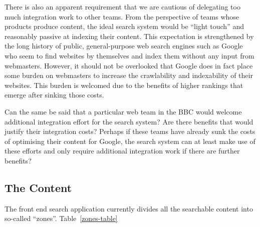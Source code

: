 There is also an apparent requirement that we are cautious of delegating
too much integration work to other teams. From the perspective of teams
whose products produce content, the ideal search system would be
``light touch'' and reasonably passive at indexing their content. This
expectation is strengthened by the long history of public, general-purpose
web search engines such as Google who seem to find websites by themselves
and index them without any input from webmasters. However, it should
not be overlooked that Google does in fact place some burden on webmasters
to increase the crawlability and indexability of their websites. This
burden is welcomed due to the benefits of higher rankings that emerge
after sinking those costs.

Can the same be said that a particular web team
in the BBC would welcome additional integration effort for the search system?
Are there benefits that would justify their integration costs? Perhaps if
these teams have already sunk the costs of optimising their content for
Google, the search system can at least make use of these efforts and only
require additional integration work if there are further benefits?

\subsection{The Content}
\label{content}

The front end search application currently divides all the searchable
content into so-called ``zones''. Table~\ref{zones-table}

